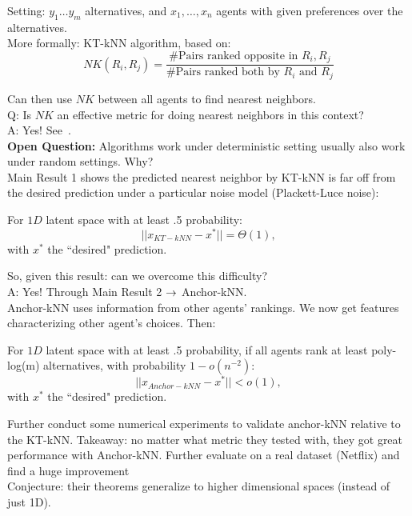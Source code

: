 Setting: $y_1 \ldots y_m$ alternatives, and $x_1, \ldots, x_n$ agents with given preferences over the alternatives. \\

More formally: KT-kNN algorithm, based on:
\[
NK(R_i, R_j) =\frac{\text{\# Pairs ranked opposite in $R_i, R_j$}}{\text{\# Pairs ranked both by $R_i$ and $R_j$}}
\]

Can then use $NK$ between all agents to find nearest neighbors. \\

Q: Is $NK$ an effective metric for doing nearest neighbors in this context? \\

A: Yes! See~\citet{katz2017nonparametric}.\\

{\bf Open Question:} Algorithms work under deterministic setting usually also work under random settings. Why? \\

Main Result 1 shows the predicted nearest neighbor by KT-kNN is far off from the desired prediction under a particular noise model (Plackett-Luce noise):
\begin{theorem}
For $1D$ latent space with at least .5 probability:
\[
||x_{KT-kNN} - x^*|| = \Theta(1),
\]
with $x^*$ the ``desired" prediction.
\end{theorem}

So, given this result: can we overcome this difficulty? \\

A: Yes! Through Main Result 2 $\rightarrow$ Anchor-kNN. \\

Anchor-kNN uses information from other agents' rankings. We now get features characterizing other agent's choices. Then:
\begin{theorem}
For $1D$ latent space with at least .5 probability, if all agents rank at least poly-log(m) alternatives, with probability $1-o(n^{-2})$:
\[
||x_{Anchor-kNN} - x^*|| < o(1),
\]
with $x^*$ the ``desired" prediction.
\end{theorem}

Further conduct some numerical experiments to validate anchor-kNN relative to the KT-kNN. Takeaway: no matter what metric they tested with, they got great performance with Anchor-kNN. Further evaluate on a real dataset (Netflix) and find a huge improvement \\

Conjecture: their theorems generalize to higher dimensional spaces (instead of just 1D). \\

